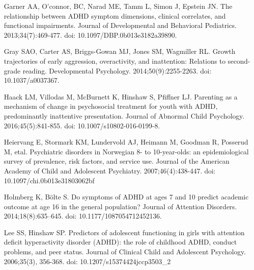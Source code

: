 \documentclass[10pt,letterpaper]{article}
\begin{document}
{{\begin{thebibliography}{10}
 
Garner AA, O'connor, BC, Narad ME, Tamm L, Simon J,
 Epstein JN.
\newblock The relationship between {ADHD} symptom dimensions, clinical
  correlates, and functional impairments.
\newblock Journal of Developmental and Behavioral Pediatrics. 2013;34(7):469-477. doi: 10.1097/DBP.0b013e3182a39890.


Gray SAO, Carter AS, Briggs-Gowan MJ, Jones SM,
Wagmiller RL.
\newblock Growth trajectories of early aggression, overactivity, and
  inattention: Relations to second-grade reading.
\newblock Developmental Psychology. 2014;50(9):2255-2263. doi: 10.1037/a0037367. 

Haack LM, Villodas M, McBurnett K, Hinshaw S, Pfiffner LJ.
\newblock Parenting as a mechanism of change in psychosocial treatment for
  youth with {ADHD}, predominantly inattentive presentation.
\newblock Journal of Abnormal Child Psychology. 2016;45(5):841-855. doi: 10.1007/s10802-016-0199-8.


Heiervang E, Stormark KM, Lundervold AJ, Heimann M, Goodman R, Posserud M, etal.  
\newblock Psychiatric disorders in {N}orwegian 8- to 10-year-olds: an
  epidemiological survey of prevalence, risk factors, and service use.
\newblock Journal of the American Academy of Child and Adolescent
  Psychiatry. 2007;46(4):438-447. doi: 10.1097/chi.0b013e31803062bf

Holmberg K, {B\"{o}lte} S.
\newblock Do symptoms of {ADHD} at ages 7 and 10 predict academic outcome at
  age 16 in the general population?
\newblock Journal of Attention Disorders. 2014;18(8):635--645. doi: 10.1177/1087054712452136.

Lee SS, Hinshaw SP.
\newblock Predictors of adolescent functioning in girls with attention deficit
  hyperactivity disorder ({ADHD}): the role of childhood {ADHD}, conduct
  problems, and peer status.
\newblock Journal of Clinical Child and Adolescent Psychology. 2006;35(3), 356-368. doi: 10.1207/s15374424jccp3503\_2


\end{thebibliography}}}
\end{document}
